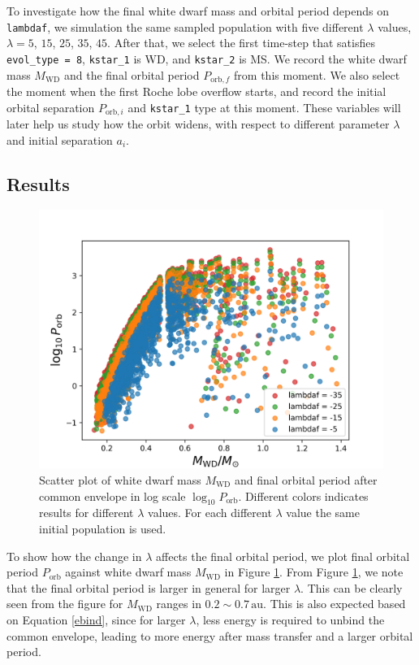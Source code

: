 \documentclass[12pt]{article}
\newcommand{\MWD}{M_{\mathrm{WD}}}
\newcommand{\Porb}{P_{\mathrm{orb}}}
\newcommand{\au}{\, \mathrm{au}}
\begin{document}
To investigate how the final white dwarf mass and orbital period depends on \verb|lambdaf|, we simulation the same sampled population with five different $\lambda$ values, $\lambda = 5$, $15$, $25$, $35$, $45$. After that, we select the first time-step that satisfies \verb|evol_type = 8|, \verb|kstar_1| is WD, and \verb|kstar_2| is MS. We record the white dwarf mass $\MWD$ and the final orbital period $P_{\mathrm{orb}, f}$ from this moment. We also select the moment when the first Roche lobe overflow starts, and record the initial orbital separation $P_{\mathrm{orb}, i}$ and \verb|kstar_1| type at this moment. These variables will later help us study how the orbit widens, with respect to different parameter $\lambda$ and initial separation $a_i$.

\subsection{Results}
\begin{figure}
  \centering
  \includegraphics[width=0.6\linewidth]{fig/Mwd-P scatter.png}
  \caption{Scatter plot of white dwarf mass $\MWD$ and final orbital period after common envelope in log scale $\log_{10}\Porb$. Different colors indicates results for different $\lambda$ values. For each different $\lambda$ value the same initial population is used.}
  \label{Mwd-P-scatter}
\end{figure}

To show how the change in $\lambda$ affects the final orbital period, we plot final orbital period $\Porb$ against white dwarf mass $\MWD$ in Figure \ref{Mwd-P-scatter}. From Figure \ref{Mwd-P-scatter}, we note that the final orbital period is larger in general for larger $\lambda$. This can be clearly seen from the figure for $\MWD$ ranges in $0.2 \sim 0.7 \au$. This is also expected based on Equation \ref{ebind}, since for larger $\lambda$, less energy is required to unbind the common envelope, leading to more energy after mass transfer and a larger orbital period.
\end{document}
